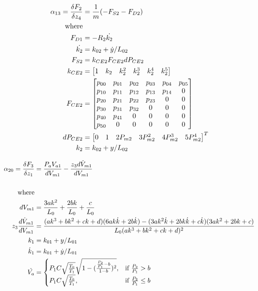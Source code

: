 \documentclass[11pt,a4paper]{article}
\begin{document}
\begin{appendices}
\begin{align}
    \alpha_{13} = \fdv{F_2}{z_4} &= \frac{1}{m}(-F_{S2} - F_{D2})
    \label{math:alpha_13_matrix}\\
    \text{where}\nonumber\\
    F_{D1} &= -R_2\dot{k_2}\nonumber\\
    \dot{k_2} &= k_{02} + \dot{y}/L_{02}\nonumber\\
    F_{S2} &= k_{CE2} F_{CE2} dP_{CE2}\nonumber\\
    k_{CE2} &= 
    \begin{bmatrix}
        1 & k_2 & k_2^2 & k_2^3 & k_2^4 & k_2^5
    \end{bmatrix}\nonumber\\
    F_{CE2} &= 
    \begin{bmatrix}
             p_{00} & p_{01} & p_{02} & p_{03} & p_{04} & p_{05}\\
             p_{10} & p_{11} & p_{12} & p_{13} & p_{14} & 0\\
             p_{20} & p_{21} & p_{22} & p_{23} & 0 &   0\\
             p_{30} & p_{31} & p_{32} & 0 &   0 &   0\\
             p_{40} & p_{41} & 0 &   0 &   0 &   0\\
             p_{50} & 0 &   0 &   0 &   0 &   0
    \end{bmatrix}\nonumber\\
    dP_{CE2} &= 
    \begin{bmatrix}
        0 & 1 & 2P_{m2} & 3P_{m2}^2 & 4P_{m2}^3 & 5P_{m2}^4
    \end{bmatrix}^T\nonumber\\
    k_{2} &= k_{02} + y/L_{02}\nonumber
\end{align}

\begin{align}
    \alpha_{20} = \fdv{F_3}{z_1} &= \frac{P_aV_{a1}}{dV_{m1}}-\frac{z_3d\dot{V}_{m1}}{dV_{m1}}\\
    \label{math:alpha_20_matrix}\\
    \text{where}\nonumber\\
    dV_{m1} &= \frac{3ak^2}{L_0}+\frac{2bk}{L_0}+\frac{c}{L_0}\nonumber\\
    z_3\frac{d\dot{V}_{m1}}{dV_{m1}} &= \frac{(ak^3+bk^2+ck+d)(6ak\dot{k}+2b\dot{k})-(3ak^2\dot{k}+2bk\dot{k}+c\dot{k})(3ak^2+2bk+c)}{L_0(ak^3+bk^2+ck+d)^2}\nonumber\\
    k_1 &= k_{01} + y/L_{01}\nonumber\\
    \dot{k}_1 &= k_{01} + \dot{y}/L_{01}\nonumber\\
    \dot{V_a} &= 
    \begin{cases} 
        P_1C\sqrt{\frac{T_0}{T_1}}\sqrt{1-(\frac{\frac{P_2}{P_1}-b}{1-b})^2}, & \text{if}\ \frac{P_2}{P_1} > b\\ 
        P_1C\sqrt{\frac{T_0}{T_1}}, & \text{if}\ \frac{P_2}{P_1} \leq b
    \end{cases}\nonumber
\end{align}


\end{appendices}
\end{document}
